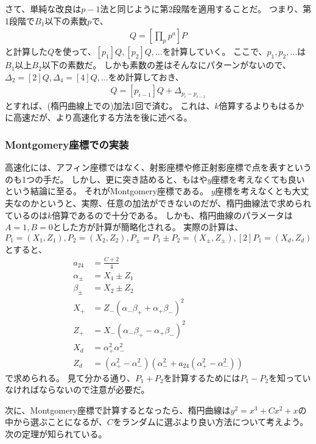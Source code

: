 さて、単純な改良は$p-1$法と同じように第2段階を適用することだ。
つまり、第1段階で$B_1$以下の素数$p$で、
\begin{align*}
Q = \left[\prod_{p} p^a\right] P
\end{align*}
と計算した$Q$を使って、$[p_1]Q, [p_2]Q, \ldots$を計算していく。
ここで、$p_1,p_2,\ldots$は$B_1$以上$B_2$以下の素数だ。
しかも素数の差はそんなにパターンがないので、$\Delta_2=[2]Q, \Delta_4=[4]Q,\ldots$をめ計算しておき、
\begin{align*}
[p_i]Q = [p_{i-1}]Q + \Delta_{p_i-p_{i-1}}
\end{align*}
とすれば、(楕円曲線上での)加法1回で済む。
これは、$k$倍算するよりもはるかに高速だが、より高速化する方法を後に述べる。

\subsubsection{Montgomery座標での実装}
高速化には、アフィン座標ではなく、射影座標や修正射影座標で点を表すというのも1つの手だ。
しかし、更に突き詰めると、もはや$y$座標を考えなくても良いという結論に至る。
それがMontgomery座標である。
$y$座標を考えなくとも大丈夫なのかというと、実際、任意の加法ができないのだが、楕円曲線法で求められているのは$k$倍算であるので十分である。
しかも、楕円曲線のパラメータは$A=1,B=0$とした方が計算が簡略化される。
実際の計算は、$P_1=(X_1,Z_1), P_2=(X_2,Z_2), P_{\pm}=P_1{\pm}P_2=(X_{\pm},Z_{\pm}),[2]P_1=(X_d,Z_d)$とすると、
\begin{align*}
a_{24} &= \frac{C + 2}{4}\\
\alpha_{\pm} &= X_1 \pm Z_1\\
\beta_{\pm} &= X_2 \pm Z_2\\
X_+ &= Z_-(\alpha_-\beta_+ + \alpha_+\beta_-)^2\\
Z_+ &= X_-(\alpha_-\beta_+ - \alpha_+\beta_-)^2\\
X_d &= \alpha_+^2\alpha_-^2\\
Z_d &= (\alpha_+^2 - \alpha_-^2)(\alpha_-^2 + a_{24}(\alpha_+^2 - \alpha_-^2))
\end{align*}
で求められる。
見て分かる通り、$P_1+P_2$を計算するためには$P_1-P_2$を知っていなければならないので注意が必要だ。

次に、Montgomery座標で計算するとなったら、楕円曲線は$y^2=x^3+Cx^2+x$の中から選ぶことになるが、$C$をランダムに選ぶより良い方法について考えよう。
次の定理が知られている。

